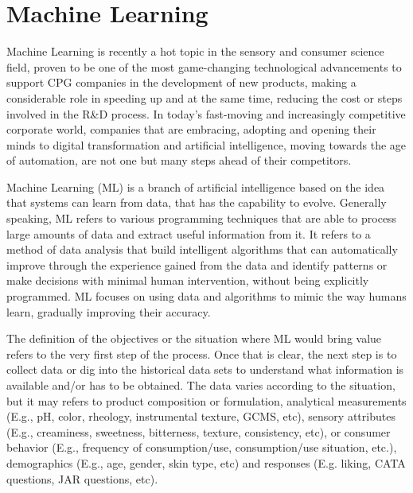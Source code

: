 \documentclass[
]{book}
\begin{document}
\hypertarget{machine-learning}{%
\chapter{Machine Learning}\label{machine-learning}}

Machine Learning is recently a hot topic in the sensory and consumer science field, proven to be one of the most game-changing technological advancements to support CPG companies in the development of new products, making a considerable role in speeding up and at the same time, reducing the cost or steps involved in the R\&D process. In today's fast-moving and increasingly competitive corporate world, companies that are embracing, adopting and opening their minds to digital transformation and artificial intelligence, moving towards the age of automation, are not one but many steps ahead of their competitors.

Machine Learning (ML) is a branch of artificial intelligence based on the idea that systems can learn from data, that has the capability to evolve. Generally speaking, ML refers to various programming techniques that are able to process large amounts of data and extract useful information from it. It refers to a method of data analysis that build intelligent algorithms that can automatically improve through the experience gained from the data and identify patterns or make decisions with minimal human intervention, without being explicitly programmed. ML focuses on using data and algorithms to mimic the way humans learn, gradually improving their accuracy.

The definition of the objectives or the situation where ML would bring value refers to the very first step of the process. Once that is clear, the next step is to collect data or dig into the historical data sets to understand what information is available and/or has to be obtained. The data varies according to the situation, but it may refers to product composition or formulation, analytical measurements (E.g., pH, color, rheology, instrumental texture, GCMS, etc), sensory attributes (E.g., creaminess, sweetness, bitterness, texture, consistency, etc), or consumer behavior (E.g., frequency of consumption/use, consumption/use situation, etc.), demographics (E.g., age, gender, skin type, etc) and responses (E.g. liking, CATA questions, JAR questions, etc).
\end{document}
